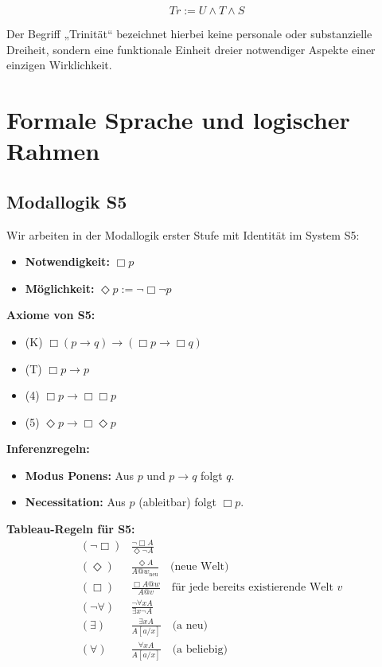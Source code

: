 \documentclass[
]{article}
\begin{document}
\[
Tr := U \land T \land S
\]

Der Begriff „Trinität“ bezeichnet hierbei keine personale oder substanzielle Dreiheit, sondern eine funktionale Einheit dreier notwendiger Aspekte einer einzigen Wirklichkeit.

\section{Formale Sprache und logischer Rahmen}

\subsection{Modallogik S5}

Wir arbeiten in der Modallogik erster Stufe mit Identität im System S5:

\begin{itemize}
\item \textbf{Notwendigkeit:} \(\Box p\)
\item \textbf{Möglichkeit:} \(\Diamond p := \neg\Box\neg p\)
\end{itemize}

\textbf{Axiome von S5:}
\begin{itemize}
\item (K) \(\Box(p \rightarrow q) \rightarrow (\Box p \rightarrow \Box q)\)
\item (T) \(\Box p \rightarrow p\)
\item (4) \(\Box p \rightarrow \Box\Box p\)
\item (5) \(\Diamond p \rightarrow \Box\Diamond p\)
\end{itemize}

\textbf{Inferenzregeln:}
\begin{itemize}
\item \textbf{Modus Ponens:} Aus \(p\) und \(p \rightarrow q\) folgt \(q\).
\item \textbf{Necessitation:} Aus \(p\) (ableitbar) folgt \(\Box p\).
\end{itemize}

\textbf{Tableau-Regeln für S5:}
\begin{align*}
& (\neg\Box) & \frac{\neg\Box A}{\Diamond\neg A} \\
& (\Diamond) & \frac{\Diamond A}{A @ w_{\text{neu}}} \quad \text{(neue Welt)} \\
& (\Box) & \frac{\Box A @ w}{A @ v} \quad \text{für jede bereits existierende Welt } v \\
& (\neg\forall) & \frac{\neg\forall x A}{\exists x \neg A} \\
& (\exists) & \frac{\exists x A}{A[a/x]} \quad \text{(a neu)} \\
& (\forall) & \frac{\forall x A}{A[a/x]} \quad \text{(a beliebig)}
\end{align*}
\end{document}
